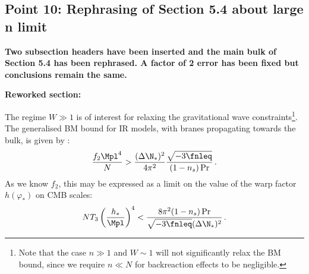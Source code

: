 \subsection{Point 10: Rephrasing of Section 5.4 about large n limit}
\textbf{Two subsection headers have been inserted and the main bulk of Section 5.4 has been
rephrased. A factor of 2 error has been fixed but conclusions remain the same.}

\textbf{Reworked section:}

The regime $W \gg 1$ is of interest for 
relaxing the gravitational wave constraints\footnote{Note that 
the case $n \gg 1$ and
$W \sim 1$ will not significantly relax the BM bound, 
since we require $n \ll N$ for backreaction effects to be negligible.}. 
The generalised BM bound for IR models, with branes propagating towards the bulk, is given by 
:
% 
\begin{equation}
\label{eq:f2IRlower-corr}
\frac{f_2\Mpl^4}{N} > \frac{(\Delta \N_*)^2}{4\pi^2}
\frac{\sqrt{-3\fnleq}}{(1-n_s)\Pr}  \,.
\end{equation}
% 
As we know $f_2$, this may be expressed as 
a limit on the value of the warp factor $h(\varphi_*)$ on CMB scales: 
% 
\begin{equation}
\label{eq:warptorelax-corr}
N T_3 \left(\frac{h_*}{\Mpl}\right)^4 < 
\frac{8\pi^2 (1-n_s)\Pr}{\sqrt{-3\fnleq}(\Delta \N_*)^2} \,.
\end{equation}
% 


